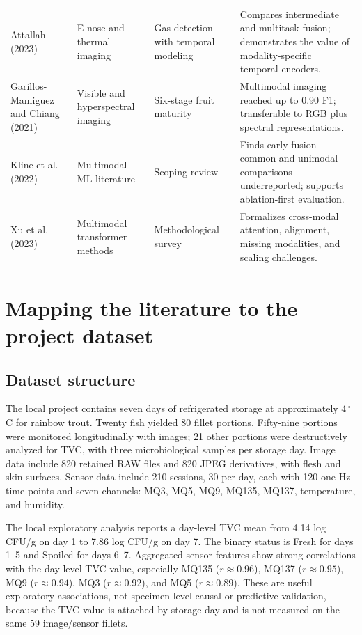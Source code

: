 \documentclass[11pt]{article}
\begin{document}
\begin{table}[H]
\begin{tabularx}{\textwidth}{P{0.19\textwidth}P{0.18\textwidth}P{0.25\textwidth}Y}
Attallah (2023) & E-nose and thermal imaging & Gas detection with temporal modeling & Compares intermediate and multitask fusion; demonstrates the value of modality-specific temporal encoders.\\
Garillos-Manliguez and Chiang (2021) & Visible and hyperspectral imaging & Six-stage fruit maturity & Multimodal imaging reached up to 0.90 F1; transferable to RGB plus spectral representations.\\
Kline et al. (2022) & Multimodal ML literature & Scoping review & Finds early fusion common and unimodal comparisons underreported; supports ablation-first evaluation.\\
Xu et al. (2023) & Multimodal transformer methods & Methodological survey & Formalizes cross-modal attention, alignment, missing modalities, and scaling challenges.\\
\bottomrule
\end{tabularx}
\end{table}

\section{Mapping the literature to the project dataset}

\subsection{Dataset structure}

The local project contains seven days of refrigerated storage at approximately 4\,$^{\circ}$C for rainbow trout. Twenty fish yielded 80 fillet portions. Fifty-nine portions were monitored longitudinally with images; 21 other portions were destructively analyzed for TVC, with three microbiological samples per storage day. Image data include 820 retained RAW files and 820 JPEG derivatives, with flesh and skin surfaces. Sensor data include 210 sessions, 30 per day, each with 120 one-Hz time points and seven channels: MQ3, MQ5, MQ9, MQ135, MQ137, temperature, and humidity.

The local exploratory analysis reports a day-level TVC mean from 4.14 log CFU/g on day 1 to 7.86 log CFU/g on day 7. The binary status is Fresh for days 1--5 and Spoiled for days 6--7. Aggregated sensor features show strong correlations with the day-level TVC value, especially MQ135 ($r\approx0.96$), MQ137 ($r\approx0.95$), MQ9 ($r\approx0.94$), MQ3 ($r\approx0.92$), and MQ5 ($r\approx0.89$). These are useful exploratory associations, not specimen-level causal or predictive validation, because the TVC value is attached by storage day and is not measured on the same 59 image/sensor fillets.
\end{document}

